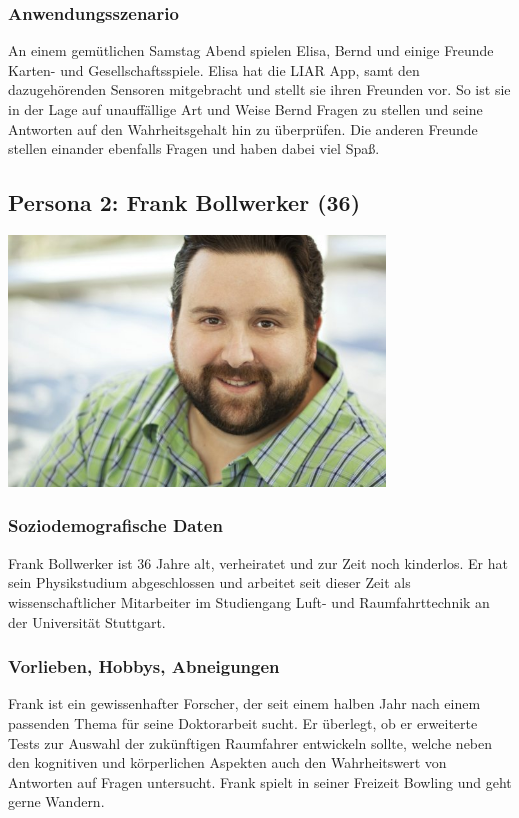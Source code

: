 \documentclass[10pt, a4paper, oneside, titlepage]{scrartcl} %
\begin{document}
	\subsubsection{Anwendungsszenario}
	An einem gemütlichen Samstag Abend spielen Elisa, Bernd und einige Freunde Karten- und Gesellschaftsspiele. Elisa hat die LIAR App, samt den dazugehörenden Sensoren mitgebracht und stellt sie ihren Freunden vor. So ist sie in der Lage auf unauffällige Art und Weise Bernd Fragen zu stellen und seine Antworten auf den Wahrheitsgehalt hin zu überprüfen. Die anderen Freunde stellen einander ebenfalls Fragen und haben dabei viel Spaß.
   
   	\subsection{Persona 2: Frank Bollwerker (36)}
   	\begin{center}
		\includegraphics[width=10.0cm]{persona_02.jpg}
	\end{center}
	\subsubsection{Soziodemografische Daten}
	Frank Bollwerker ist 36 Jahre alt, verheiratet und zur Zeit noch kinderlos. Er hat sein Physikstudium abgeschlossen und arbeitet seit dieser Zeit als wissenschaftlicher Mitarbeiter im Studiengang Luft- und Raumfahrttechnik an der Universität Stuttgart.
	\subsubsection{Vorlieben, Hobbys, Abneigungen}
	Frank ist ein gewissenhafter Forscher, der seit einem halben Jahr nach einem passenden Thema für seine Doktorarbeit sucht. Er überlegt, ob er erweiterte Tests zur Auswahl der zukünftigen Raumfahrer entwickeln sollte, welche neben den kognitiven und körperlichen Aspekten auch den Wahrheitswert von Antworten auf Fragen untersucht. Frank spielt in seiner Freizeit Bowling und geht gerne Wandern.
\end{document}
